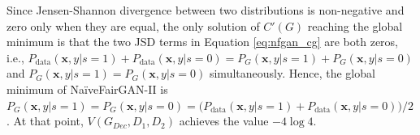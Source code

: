 \documentclass[sigconf]{acmart}
\theoremstyle{definition}
\begin{document}
Since Jensen-Shannon divergence between two distributions is non-negative and zero only when they are equal, the only solution of $C'(G)$ reaching the global minimum is that the two JSD terms in Equation \ref{eq:nfgan_cg} are both zeros, i.e., $P_{\text{data}}(\mathbf{x},y|s=1)+P_{\text{data}}(\mathbf{x},y|s=0) = P_{G}(\mathbf{x},y|s=1)+P_{G}(\mathbf{x},y|s=0)$ and $P_{G}(\mathbf{x},y|s=1) = P_{G}(\mathbf{x},y|s=0)$ simultaneously. Hence, the global minimum of Na\"iveFairGAN-II is $P_{G}(\mathbf{x},y|s=1) = P_{G}(\mathbf{x},y|s=0) = \big(P_{\text{data}}(\mathbf{x},y|s=1)+P_{\text{data}}(\mathbf{x},y|s=0)\big)/2$. At that point, $V(G_{Dec}, D_1, D_2)$ achieves the value $-4 \log4$.

\end{document}
